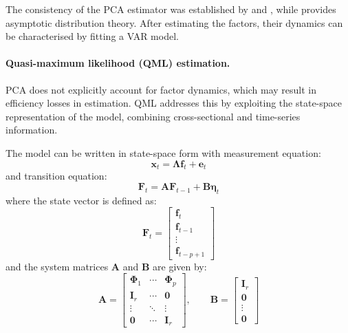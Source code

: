 The consistency of the PCA estimator was established by \citet{bai2002determining} and \citet{stock2002forecasting}, while \citet{bai2003inferential} provides asymptotic distribution theory. After estimating the factors, their dynamics can be characterised by fitting a VAR model.

\paragraph{Quasi-maximum likelihood (QML) estimation.}

PCA does not explicitly account for factor dynamics, which may result in efficiency losses in estimation. QML addresses this by exploiting the state-space representation of the model, combining cross-sectional and time-series information.

The model can be written in state-space form with measurement equation:
\begin{equation}
\boldsymbol{x}_t = \boldsymbol{\Lambda} \boldsymbol{f}_t + \boldsymbol{e}_t
\end{equation}
and transition equation:
\begin{equation}
\boldsymbol{F}_t = \boldsymbol{A} \boldsymbol{F}_{t-1} + \boldsymbol{B} \boldsymbol{\eta}_t
\end{equation}
where the state vector is defined as:
\begin{equation}
\boldsymbol{F}_t =
\begin{bmatrix}
\boldsymbol{f}_t \\
\boldsymbol{f}_{t-1} \\
\vdots \\
\boldsymbol{f}_{t-p+1}
\end{bmatrix}
\end{equation}
and the system matrices $\boldsymbol{A}$ and $\boldsymbol{B}$ are given by:
\begin{equation}
\boldsymbol{A} =
\begin{bmatrix}
\boldsymbol{\Phi}_1 & \cdots & \boldsymbol{\Phi}_p \\
\boldsymbol{I}_r & \cdots & \boldsymbol{0} \\
\vdots & \ddots & \vdots \\
\boldsymbol{0} & \cdots & \boldsymbol{I}_r
\end{bmatrix},
\qquad
\boldsymbol{B} =
\begin{bmatrix}
\boldsymbol{I}_r \\
\boldsymbol{0} \\
\vdots \\
\boldsymbol{0}
\end{bmatrix}
\end{equation}

